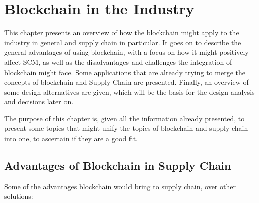 \chapter{Blockchain in the Industry}
\label{chap:blockchain-applicability}

\minitoc \mtcskip \noindent

This chapter presents an overview of how the blockchain might apply to the industry in general and supply chain in particular. It goes on to describe the general advantages of using blockchain, with a focus on how it might positively affect SCM, as well as the disadvantages and challenges the integration of blockchain might face. Some applications that are already trying to merge the concepts of blockchain and Supply Chain are presented. Finally, an overview of some design alternatives are given, which will be the basis for the design analysis  and decisions later on. 

The purpose of this chapter is, given all the information already presented, to present some topics that might unify the topics of blockchain and supply chain into one, to ascertain if they are a good fit.


\section{Advantages of Blockchain in Supply Chain}
\label{sec:advantes-blockchain}
Some of the advantages blockchain would bring to supply chain, over other solutions:

